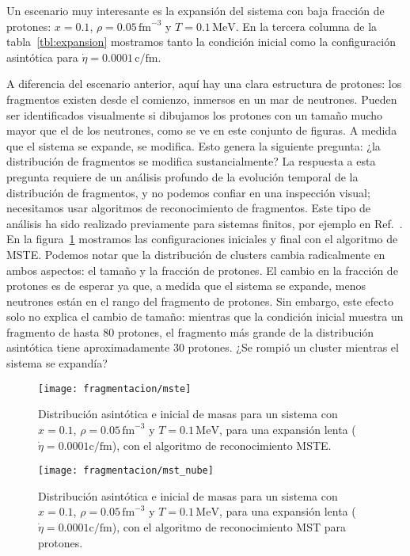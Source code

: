 Un escenario muy interesante es la expansión del sistema con baja fracción de protones: $x = 0.1$, $\rho = 0.05\,\text{fm}^{-3}$ y $T = 0.1\,\text{MeV}$.
En la tercera columna de la tabla~\ref{tbl:expansion} mostramos tanto la condición inicial como la configuración asintótica para $\dot{\eta} = 0.0001\,\text{c/fm}$. 

A diferencia del escenario anterior, aquí hay una clara estructura de protones: los fragmentos existen desde el comienzo, inmersos en un mar de neutrones.
Pueden ser identificados visualmente si dibujamos los protones con un tamaño mucho mayor que el de los neutrones, como se ve en este conjunto de figuras.
A medida que el sistema se expande, se modifica.
Esto genera la siguiente pregunta: ¿la distribución de fragmentos se modifica sustancialmente?
La respuesta a esta pregunta requiere de un análisis profundo de la evolución temporal de la distribución de fragmentos, y no podemos confiar en una inspección visual; necesitamos usar algoritmos de reconocimiento de fragmentos.
Este tipo de análisis ha sido realizado previamente para sistemas finitos, por ejemplo en Ref.~\cite{dorso_fluctuation_1994, strachan_fragment_1997}.
En la figura~\ref{fig:mste_pregnocchi} mostramos las configuraciones iniciales y final con el algoritmo de MSTE.\@
Podemos notar que la distribución de clusters cambia radicalmente en ambos aspectos: el tamaño y la fracción de protones.
El cambio en la fracción de protones es de esperar ya que, a medida que el sistema se expande, menos neutrones están en el rango del fragmento de protones.
Sin embargo, este efecto solo no explica el cambio de tamaño: mientras que la condición inicial muestra un fragmento de hasta 80 protones, el fragmento más grande de la distribución asintótica tiene aproximadamente 30 protones.
¿Se rompió un cluster mientras el sistema se expandía?

\begin{figure}
  \texttt{[image: fragmentacion/mste]}
  \caption{Distribución asintótica e inicial de masas para un sistema con $x = 0.1$, $\rho = 0.05\,\text{fm}^{-3}$ y $T = 0.1\,\text{MeV}$, para una expansión lenta ($\dot{\eta} = 0.0001\text{c/fm}$), con el algoritmo de reconocimiento MSTE.}
\label{fig:mste_pregnocchi}
\end{figure}

\begin{figure}
  \texttt{[image: fragmentacion/mst\_nube]}
  \caption{Distribución asintótica e inicial de masas para un sistema con $x = 0.1$, $\rho = 0.05\,\text{fm}^{-3}$ y $T = 0.1\,\text{MeV}$, para una expansión lenta ($\dot{\eta} = 0.0001\text{c/fm}$), con el algoritmo de reconocimiento MST para protones.}
\label{fig:mst_pregnocchi}
\end{figure}

